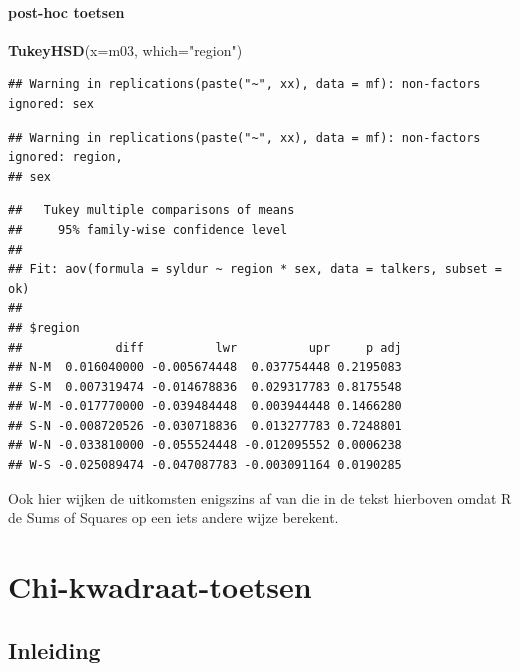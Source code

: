 \documentclass[
]{book}
\newenvironment{Shaded}{\begin{snugshade}}{\end{snugshade}}
\newcommand{\DataTypeTok}[1]{\textcolor[rgb]{0.13,0.29,0.53}{#1}}
\newcommand{\KeywordTok}[1]{\textcolor[rgb]{0.13,0.29,0.53}{\textbf{#1}}}
\newcommand{\NormalTok}[1]{#1}
\newcommand{\StringTok}[1]{\textcolor[rgb]{0.31,0.60,0.02}{#1}}
\begin{document}
\hypertarget{post-hoc-toetsen}{%
\subsubsection{post-hoc toetsen}\label{post-hoc-toetsen}}

\begin{Shaded}
\begin{Highlighting}[]
\KeywordTok{TukeyHSD}\NormalTok{(}\DataTypeTok{x=}\NormalTok{m03, }\DataTypeTok{which=}\StringTok{"region"}\NormalTok{)}
\end{Highlighting}
\end{Shaded}

\begin{verbatim}
## Warning in replications(paste("~", xx), data = mf): non-factors ignored: sex
\end{verbatim}

\begin{verbatim}
## Warning in replications(paste("~", xx), data = mf): non-factors ignored: region,
## sex
\end{verbatim}

\begin{verbatim}
##   Tukey multiple comparisons of means
##     95% family-wise confidence level
## 
## Fit: aov(formula = syldur ~ region * sex, data = talkers, subset = ok)
## 
## $region
##             diff          lwr          upr     p adj
## N-M  0.016040000 -0.005674448  0.037754448 0.2195083
## S-M  0.007319474 -0.014678836  0.029317783 0.8175548
## W-M -0.017770000 -0.039484448  0.003944448 0.1466280
## S-N -0.008720526 -0.030718836  0.013277783 0.7248801
## W-N -0.033810000 -0.055524448 -0.012095552 0.0006238
## W-S -0.025089474 -0.047087783 -0.003091164 0.0190285
\end{verbatim}

Ook hier wijken de uitkomsten enigszins af van die in de tekst hierboven omdat R de Sums of Squares op een iets andere wijze berekent.

\hypertarget{ch:chi-kwadraat-toetsen}{%
\chapter{Chi-kwadraat-toetsen}\label{ch:chi-kwadraat-toetsen}}

\hypertarget{sec:h16inleiding}{%
\section{Inleiding}\label{sec:h16inleiding}}
\end{document}
